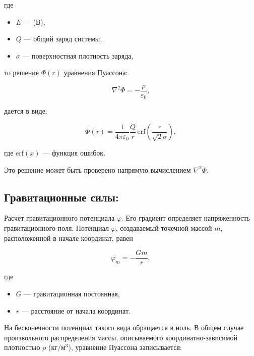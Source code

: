 где
\begin{itemize}
  \setlength{\itemsep}{-10pt}
  \item $E$ --- (В), \\
  \item $Q$ --- общий заряд системы, \\
  \item $\sigma$ --- поверхностная плотность заряда,
\end{itemize}

то решение $\Phi(r)$ уравнения Пуассона:

\begin{equation}
  \nabla^2 \Phi = -\frac{\rho}{\varepsilon_0},
\end{equation}

дается в виде:

\begin{equation}
  \Phi(r) = \frac{1}{4 \pi \varepsilon_0} \frac{Q}{r}\,\mathrm{erf}\left(\frac{r}{\sqrt{2}\sigma}\right),
\end{equation}

где $\mathrm{erf}(x)$ — функция ошибок.

Это решение может быть проверено напрямую вычислением $\nabla^2 \Phi$.

\subsection{ Гравитационные силы: }
Расчет гравитационного потенциала  $\varphi$. Его градиент определяет напряженность гравитационного поля.
Потенциал $\varphi$, создаваемый точечной массой $m$, расположенной в начале координат, равен

\begin{equation}
  \varphi_m = -\frac{G m}{r},
\end{equation}

где
\begin{itemize}
  \setlength{\itemsep}{-10pt}
  \item $G$ --- гравитационная постоянная,\\
  \item $r$ --- расстояние от начала координат.\\
\end{itemize}

\par
На бесконечности потенциал такого вида обращается в ноль. В общем случае произвольного распределения массы, описываемого координатно-зависимой плотностью $\rho$ ($\text{кг}/{\text{м}^3}$), уравнение Пуассона записывается:

